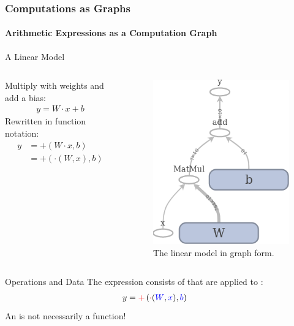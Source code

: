 
\begin{frame}
    \frametitle{Computations as Graphs}
    \framesubtitle{Arithmetic Expressions as a Computation Graph}

    \begin{block}{A Linear Model}
    \begin{columns}
        \begin{column}{0.6 \linewidth}        
            Multiply with weights and add a bias:
            \begin{align*}
                y = W \cdot x + b
            \end{align*}
            Rewritten in function notation:
            \begin{align*}
                y &= +(W \cdot x, b) \\
                  &= +\left(\cdot(W, x), b\right)
            \end{align*}
        \end{column}
        \begin{column}{0.4 \linewidth}
        \begin{figure}[h]
            \centering
            \includegraphics[width=0.45\linewidth]{utils/demo_graph.png}
            \caption{The linear model in graph form.}
        \end{figure}
        \end{column}
    \end{columns}
    \end{block}
    \begin{block}{Operations and Data}
        The expression consists of  that
        are applied to :
        \begin{align*}
            y &= \operation{+}\left( \operation{\cdot}(\data{W}, \data{x}), \data{b} \right)
        \end{align*}
        An  is not necessarily a function!
    \end{block}
\end{frame}
    
